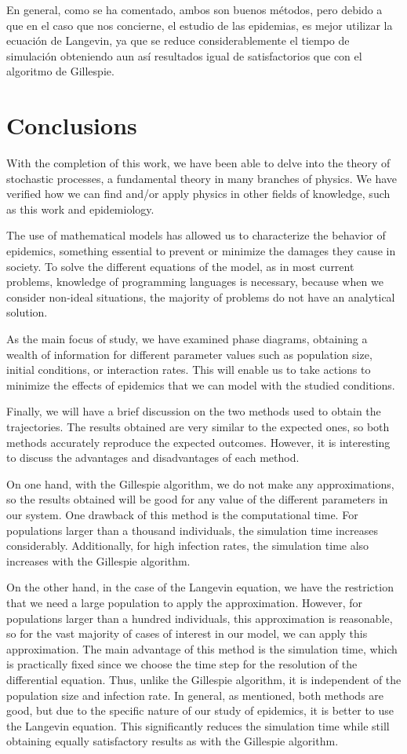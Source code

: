 En general, como se ha comentado, ambos son buenos métodos, pero debido a que en el caso que nos concierne, el estudio de las epidemias, es mejor
utilizar la ecuación de Langevin, ya que se reduce considerablemente el tiempo de simulación obteniendo aun así resultados igual de satisfactorios 
que con el algoritmo de Gillespie.


\newpage
\chapter*{Conclusions}
With the completion of this work, we have been able to delve into the theory of stochastic processes, a fundamental theory 
in many branches of physics. We have verified how we can find and/or apply physics in other fields of knowledge, such as this 
work and epidemiology.

The use of mathematical models has allowed us to characterize the behavior of epidemics, something essential to 
prevent or minimize the damages they cause in society. To solve the different equations of the model, as in most current 
problems, knowledge of programming languages is necessary, because when we consider non-ideal situations, the majority of 
problems do not have an analytical solution.

As the main focus of study, we have examined phase diagrams, obtaining a wealth of information for 
different parameter values such as population size, initial conditions, or interaction rates. This will enable us to take 
actions to minimize the effects of epidemics that we can model with the studied conditions.

Finally, we will have a brief discussion on the two methods used to obtain the trajectories. The results obtained are very 
similar to the expected ones, so both methods accurately reproduce the expected outcomes. However, it is interesting to discuss 
the advantages and disadvantages of each method.

On one hand, with the Gillespie algorithm, we do not make any approximations, so the results obtained will be good for any 
value of the different parameters in our system. One drawback of this method is the computational time. For populations larger 
than a thousand individuals, the simulation time increases considerably. Additionally, for high infection rates, the simulation 
time also increases with the Gillespie algorithm.

On the other hand, in the case of the Langevin equation, we have the restriction that we need a large population to apply 
the approximation. However, for populations larger than a hundred individuals, this approximation is reasonable, so for the 
vast majority of cases of interest in our model, we can apply this approximation. The main advantage of this method is the 
simulation time, which is practically fixed since we choose the time step for the resolution of the differential equation. 
Thus, unlike the Gillespie algorithm, it is independent of the population size and infection rate.
\newpage
In general, as mentioned, both methods are good, but due to the specific nature of our study of epidemics, it is better 
to use the Langevin equation. This significantly reduces the simulation time while still obtaining equally satisfactory 
results as with the Gillespie algorithm.